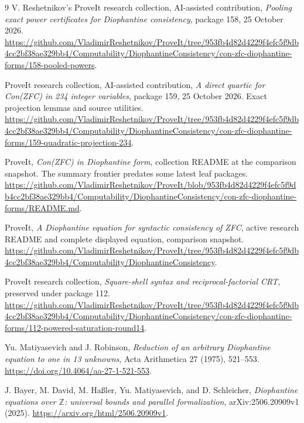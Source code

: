 \documentclass[11pt,letterpaper]{article}
\theoremstyle{definition}\newtheorem{definition}[theorem]{Definition}
\theoremstyle{remark}\newtheorem{remark}[theorem]{Remark}
\newcommand{\Z}{\mathbb Z}\newcommand{\N}{\mathbb N}
\begin{document}
\clearpage
\begin{thebibliography}{9}\small
{}
V. Reshetnikov's ProveIt research collection, AI-assisted contribution,
\emph{Pooling exact power certificates for Diophantine consistency},
package 158, 25 October 2026.
\url{https://github.com/VladimirReshetnikov/ProveIt/tree/953fb4d82d4229f4efc5f9db4cc2bf38ae329bb4/Computability/DiophantineConsistency/con-zfc-diophantine-forms/158-pooled-powers}.

ProveIt research collection, AI-assisted contribution,
\emph{A direct quartic for Con(ZFC) in 234 integer variables}, package 159,
25 October 2026. Exact projection lemmas and source utilities.
\url{https://github.com/VladimirReshetnikov/ProveIt/tree/953fb4d82d4229f4efc5f9db4cc2bf38ae329bb4/Computability/DiophantineConsistency/con-zfc-diophantine-forms/159-quadratic-projection-234}.

ProveIt, \emph{Con(ZFC) in Diophantine form}, collection README at the
comparison snapshot. The summary frontier predates some latest leaf packages.
\url{https://github.com/VladimirReshetnikov/ProveIt/blob/953fb4d82d4229f4efc5f9db4cc2bf38ae329bb4/Computability/DiophantineConsistency/con-zfc-diophantine-forms/README.md}.

ProveIt, \emph{A Diophantine equation for syntactic consistency of ZFC},
active research README and complete displayed equation, comparison snapshot.
\url{https://github.com/VladimirReshetnikov/ProveIt/tree/953fb4d82d4229f4efc5f9db4cc2bf38ae329bb4/Computability/DiophantineConsistency}.

ProveIt research collection, \emph{Square-shell syntax and
reciprocal-factorial CRT}, preserved under package 112.
\url{https://github.com/VladimirReshetnikov/ProveIt/tree/953fb4d82d4229f4efc5f9db4cc2bf38ae329bb4/Computability/DiophantineConsistency/con-zfc-diophantine-forms/112-powered-saturation-round14}.

Yu. Matiyasevich and J. Robinson,
\emph{Reduction of an arbitrary Diophantine equation to one in 13 unknowns},
Acta Arithmetica 27 (1975), 521--553.
\url{https://doi.org/10.4064/aa-27-1-521-553}.

J. Bayer, M. David, M. Ha\ss ler, Yu. Matiyasevich, and D. Schleicher,
\emph{Diophantine equations over $\Z$: universal bounds and parallel
formalization}, arXiv:2506.20909v1 (2025).
\url{https://arxiv.org/html/2506.20909v1}.
\end{thebibliography}
\end{document}
